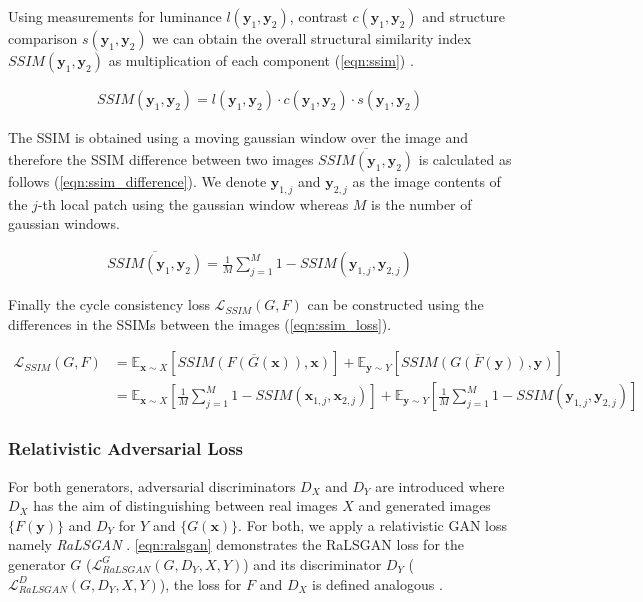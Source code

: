 \documentclass[a4paper,11pt, DIV=12]{scrartcl}
\newcommand{\x}{\boldsymbol{x}}
\newcommand{\y}{\boldsymbol{y}}
\begin{document}
Using measurements for luminance $l(\y_1, \y_2)$, contrast $c(\y_1,\y_2)$ and structure comparison $s(\y_1, \y_2)$ we can obtain the overall structural similarity 
index $SSIM(\y_1, \y_2)$ as multiplication of each component (\autoref{eqn:ssim}) \cite{ssim}.

\begin{equation}
   \label{eqn:ssim}
   \begin{aligned}
      SSIM(\y_1, \y_2) = l(\y_1, \y_2) \cdot c(\y_1,\y_2) \cdot s(\y_1, \y_2)
   \end{aligned}
\end{equation}

The SSIM is obtained using a moving gaussian window over the image and therefore the SSIM difference between two images $\overline{SSIM(\y_1,\y_2)}$ is calculated as follows (\autoref{eqn:ssim_difference}).
We denote $\y_{1,j}$ and $\y_{2,j}$ as the image contents of the $j$-th local patch using the gaussian window whereas $M$ is the number of gaussian windows.    

\begin{equation}
   \label{eqn:ssim_difference}
   \begin{aligned}
      \overline{SSIM(\y_1,\y_2)} = \frac{1}{M}\sum_{j=1}^{M}1 - SSIM(\y_{1,j},\y_{2,j}) 
   \end{aligned}
\end{equation}

Finally the cycle consistency loss $\mathcal{L}_{SSIM}(G,F)$ can be constructed using the differences in the SSIMs between the images (\autoref{eqn:ssim_loss}). 

\begin{equation}
   \label{eqn:ssim_loss}
   \begin{aligned}
      \mathcal{L}_{SSIM}(G,F) & = \mathbb{E}_{\x \sim X}\left[\overline{SSIM(F(G(\x)), \x)}\right] + \mathbb{E}_{\y \sim Y}\left[\overline{SSIM(G(F(\y)), \y)}\right] \\
                              & = \mathbb{E}_{\x \sim X}\left[\frac{1}{M}\sum_{j=1}^{M}1 - SSIM(\x_{1,j},\x_{2,j})\right] + 
      \mathbb{E}_{\y \sim Y}\left[\frac{1}{M}\sum_{j=1}^{M}1 - SSIM(\y_{1,j},\y_{2,j})\right]
   \end{aligned}
\end{equation}


\subsubsection*{Relativistic Adversarial Loss}
For both generators, adversarial discriminators $D_X$ and $D_Y$ are introduced where $D_X$ has the aim of distinguishing between real images 
$X$ and generated images $\{F(\y)\}$ and $D_Y$ for $Y$ and $\{G(\x)\}$.
For both, we apply a relativistic GAN loss namely \textit{RaLSGAN} \cite{mehri2019colorizing,rel_gan}. 
\autoref{eqn:ralsgan} demonstrates the RaLSGAN loss for the generator $G$ ($\mathcal{L}^G_{RaLSGAN}(G,D_Y,X,Y)$) and its discriminator 
$D_Y$ ($\mathcal{L}^D_{RaLSGAN}(G,D_Y,X,Y)$), the loss for $F$ and $D_X$ is defined analogous \cite*{rel_gan}.
\end{document}
